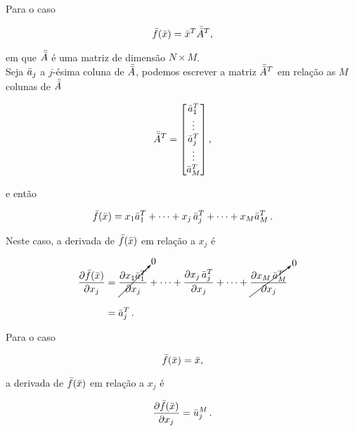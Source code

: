\begin{example}
    Para o caso

    \begin{equation}
    \bar{f}(\bar{x}) = \bar{x}^T\bar{\bar{A}}^T  ,
    \end{equation}

    \noindent em que $\bar{\bar{A}}$ é uma matriz de dimensão $N \times M$.
    \\
    \indent
    Seja $\bar{a}_j$ a $j$-ésima coluna de $\bar{\bar{A}}$, podemos escrever a matriz
    $\bar{\bar{A}}^T$ em relação as $M$ colunas de $\bar{\bar{A}}$

    \begin{equation}
    \bar{\bar{A}}^T =
        \begin{bmatrix}
        \bar{a}_1^T \\ \vdots \\ \bar{a}_j^T \\ \vdots \\ \bar{a}_M^T
        \end{bmatrix} ,
    \end{equation}

    \noindent e então

    \begin{equation}
    \bar{f}(\bar{x}) = x_1\bar{a}_1^T + \dotsb + x_j\thinspace\bar{a}_j^T +
    \dotsb + x_M\bar{a}_M^T \thinspace .
    \end{equation}

    \indent Neste caso, a derivada de  $\bar{f}(\bar{x})$ em relação
    a $x_j$ é
    
    \begin{equation}
    \begin{split}
    \dfrac{\partial \bar{f}(\bar{x})}{\partial x_j} &=
        \cancelto{0}{\dfrac{\partial x_1\bar{a}_1^T}{\partial x_j}} + \dotsb +
        \dfrac{\partial x_j\thinspace\bar{a}_j^T}{\partial x_j} + \dotsb +
        \cancelto{0}{\dfrac{\partial x_M\thinspace\bar{a}_M^T}{\partial x_j}}
    \\[0.3cm]
    &=
    \bar{a}_j^T
    \thinspace .
    \end{split}
    \end{equation}
\end{example}

\begin{example}
    Para o caso

    \begin{equation}
    \bar{f}(\bar{x}) = \bar{x} ,
    \end{equation}
    
    \noindent a derivada de  $\bar{f}(\bar{x})$ em relação
    a $x_j$ é
    
    \begin{equation}
    \dfrac{\partial \bar{f}(\bar{x})}{\partial x_j} = \bar{u}_j^M
    \thinspace .
    \end{equation}
\end{example}

